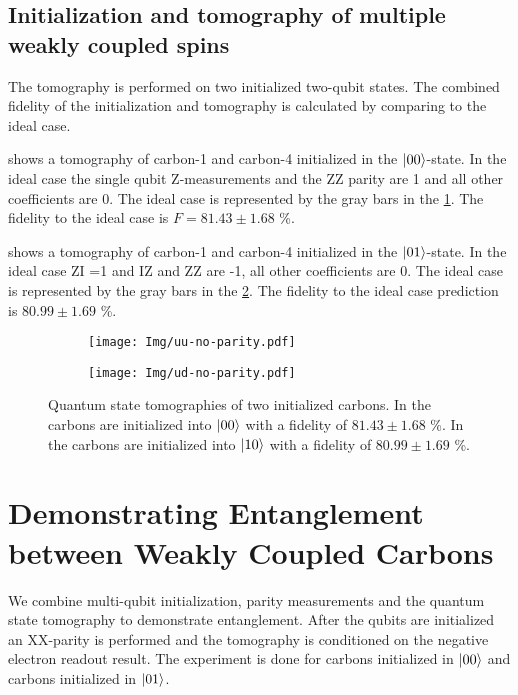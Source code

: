 \subsection{Initialization and tomography of multiple weakly coupled spins}
The tomography is performed on two initialized two-qubit states.
The combined fidelity of the initialization and tomography is calculated by comparing to the ideal case.

 shows a tomography of carbon-1 and carbon-4 initialized in the ${\left\vert{00}\right\rangle}$-state.
In the ideal case the single qubit Z-measurements and the ZZ parity are 1 and all other coefficients are 0.
The ideal case is represented by the gray bars in the \cref{fig:uu-init }.
The fidelity to the ideal case is $F = 81.43 \pm 1.68$ \%.

 shows a tomography of carbon-1 and carbon-4 initialized in the ${\left\vert{01}\right\rangle}$-state.
In the ideal case ZI =1 and IZ and ZZ are -1, all other coefficients are 0.
The ideal case is represented by the gray bars in the \cref{fig:ud-init }.
The fidelity to the ideal case prediction is $80.99 \pm 1.69$ \%.

\begin{figure}[htbp]
    \begin{subfigure}[t]{0.49\textwidth}\centering
        \caption{}
        \texttt{[image: Img/uu-no-parity.pdf]}
        \label{fig:uu-init }
    \end{subfigure}
    \begin{subfigure}[t]{0.49\textwidth}\centering
        \caption{}
        \texttt{[image: Img/ud-no-parity.pdf]}
        \label{fig:ud-init }
    \end{subfigure}
    \caption{ Quantum state tomographies of two initialized carbons. In  the carbons are initialized into ${\left\vert{00}\right\rangle}$ with a fidelity of  $81.43 \pm 1.68$ \%.
    In  the carbons are initialized into ${\left\vert{10}\right\rangle}$ with a fidelity of $80.99 \pm 1.69$ \%.
    }
    \label{fig:2qubitTomos}
\end{figure}

\section{Demonstrating Entanglement between Weakly Coupled Carbons}
We combine multi-qubit initialization, parity measurements and the quantum state tomography to demonstrate entanglement.
After the qubits are initialized an XX-parity is performed and the tomography is conditioned on the negative electron readout result.
The experiment is done for carbons initialized in ${\left\vert{00}\right\rangle}$ and carbons initialized in ${\left\vert{01}\right\rangle}$.

